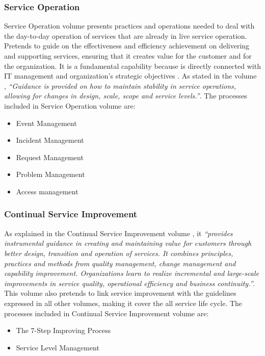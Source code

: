 \subsubsection{Service Operation} 

Service Operation volume presents practices and operations needed to deal with the day-to-day operation of services that are already in live service operation. Pretends to guide on the effectiveness and efficiency achievement on delivering and supporting services, ensuring that it creates value for the customer and for the organization. It is a fundamental capability because is directly connected with IT management and organization's strategic objectives . As stated in the volume \cite{itilSO}, \textit{``Guidance is provided on how to maintain stability in service operations, allowing for changes in design, scale, scope and service levels.''}. The processes included in Service Operation volume are:

\begin{itemize}
  \item Event Management
  \item Incident Management
  \item Request Management
  \item Problem Management
  \item Access management
\end{itemize} 

\subsubsection{Continual Service Improvement}

As explained in the Continual Service Improvement volume \cite{itilST}, it \textit{``provides instrumental guidance in creating and maintaining value for customers through better design, transition and operation of services. It combines principles, practices and methods from quality management, change management and capability improvement. Organizations learn to realize incremental and large-scale improvements in service quality, operational efficiency and business continuity.''}. This volume also pretends to link service improvement with the guidelines expressed in all other volumes, making it cover the all service life cycle. The processes included in Continual Service Improvement volume are:

\begin{itemize}
  \item The 7-Step Improving Process
  \item Service Level Management
\end{itemize} 


